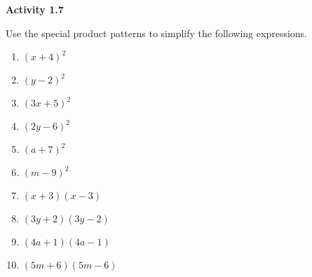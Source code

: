\vspace{1ex}
\noindent\textbf{Activity 1.7}

\vspace{0.75ex}

Use the special product patterns to simplify the following expressions.
\begin{multicols}{2}
\begin{enumerate}
    \item \( (x + 4)^2 \)
    \item \( (y - 2)^2 \)
    \item \( (3x + 5)^2 \)
    \item \( (2y - 6)^2 \)
    \item \( (a + 7)^2 \)
    \item \( (m - 9)^2 \)
    \item \( (x + 3)(x - 3) \)
    \item \( (3y + 2)(3y - 2) \)
    \item \( (4a + 1)(4a - 1) \)
    \item \( (5m + 6)(5m - 6) \)
\end{enumerate}
\end{multicols} 